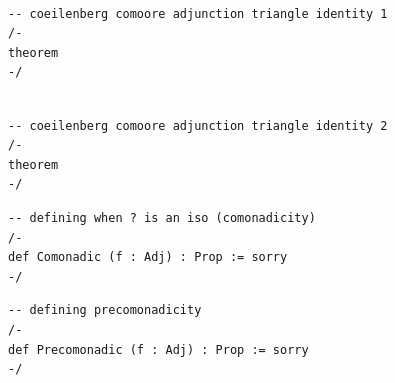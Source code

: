 \documentclass{book}
\newcounter{lcounter}
\begin{document}
\begin{center}
\begin{tcolorbox}[width=5in,colback={white},title={\begin{center}\texttt{Lean \thelcounter} \addtocounter{lcounter}{1}  \end{center}},colbacktitle=Blue,coltitle=black]
\begin{verbatim}

-- coeilenberg comoore adjunction triangle identity 1
/-
theorem
-/

\end{verbatim}%
\end{tcolorbox}
\end{center}


\begin{center}
\begin{tcolorbox}[width=5in,colback={white},title={\begin{center}\texttt{Lean \thelcounter} \addtocounter{lcounter}{1}  \end{center}},colbacktitle=Blue,coltitle=black]
\begin{verbatim}

-- coeilenberg comoore adjunction triangle identity 2
/-
theorem
-/

\end{verbatim}%
\end{tcolorbox}
\end{center}

\begin{center}
\begin{tcolorbox}[width=5in,colback={white},title={\begin{center}\texttt{Lean \thelcounter} \addtocounter{lcounter}{1}  \end{center}},colbacktitle=Blue,coltitle=black]
\begin{verbatim}
-- defining when ? is an iso (comonadicity)
/-
def Comonadic (f : Adj) : Prop := sorry
-/
\end{verbatim}%
\end{tcolorbox}
\end{center}


\begin{center}
\begin{tcolorbox}[width=5in,colback={white},title={\begin{center}\texttt{Lean \thelcounter} \addtocounter{lcounter}{1}  \end{center}},colbacktitle=Blue,coltitle=black]
\begin{verbatim}
-- defining precomonadicity
/-
def Precomonadic (f : Adj) : Prop := sorry
-/
\end{verbatim}%
\end{tcolorbox}
\end{center}
\end{document}
